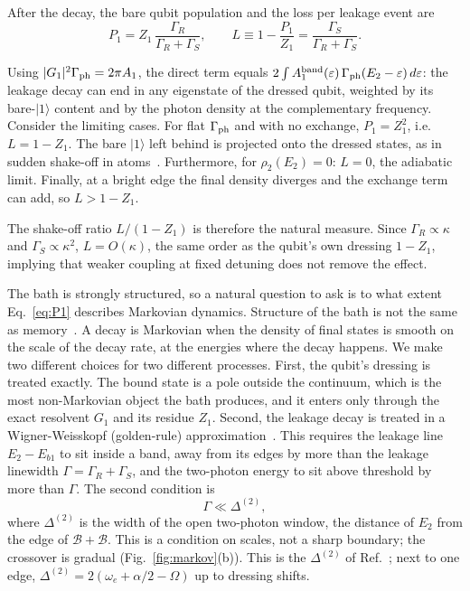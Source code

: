 \documentclass[aps,prresearch,twocolumn,superscriptaddress,nofootinbib,longbibliography,floatfix]{revtex4-2}
\begin{document}
After the decay, the bare qubit population and the loss per leakage event are
\begin{equation}
P_1=Z_1\,\frac{\Gamma_R}{\Gamma_R+\Gamma_{S}},\qquad L\equiv1-\frac{P_1}{Z_1}=\frac{\Gamma_{S}}{\Gamma_R+\Gamma_{S}} .
\label{eq:P1}
\end{equation}

Using $|G_1|^2\Gamma_{\rm ph}=2\pi A_1$, the direct term equals
$2\int A_1^{\rm band}(\varepsilon)\,\Gamma_{\rm ph}(E_2-\varepsilon)\,d\varepsilon$: the leakage decay can end in any
eigenstate of the dressed qubit, weighted by its bare-$|1\rangle$ content and by the photon density at the complementary
frequency. Consider the limiting cases. 
For flat $\Gamma_{\rm ph}$ and with no exchange, $P_1=Z_1^2$, i.e.\ $L=1-Z_1$. The bare $|1\rangle$ left behind is projected
onto the dressed states, as in sudden shake-off in atoms~\cite{Aberg1967,SchneiderChocianRost2002}. Furthermore, for $\rho_2(E_2)=0$: $L=0$, the adiabatic limit.
Finally, at a bright edge the final density diverges and the exchange term can add, so $L>1-Z_1$.

The shake-off ratio $L/(1-Z_1)$ is therefore the natural measure. Since $\Gamma_R\propto\kappa$ and
$\Gamma_S\propto\kappa^2$, $L=O(\kappa)$, the same order as the qubit's own dressing $1-Z_1$, implying that weaker coupling at fixed
detuning does not remove the effect.


The bath is strongly structured, so a natural question to ask is to what extent Eq.~\eqref{eq:P1} describes Markovian dynamics.
Structure of the bath is not the same as memory~\cite{Lambropoulos2000RPP,GonzalezTudelaCirac2017,Malekakhlagh2016}. A decay is
Markovian when the density of final states is smooth on the scale of the
decay rate, at the energies where the decay happens. We make two different choices for two different processes.
First, the qubit's dressing is treated exactly. The bound state is a pole outside the continuum, which is the most non-Markovian
object the bath produces, and it enters only through the exact resolvent $G_1$ and its residue $Z_1$.
Second, the leakage decay is treated in a Wigner-Weisskopf (golden-rule) approximation~\cite{CohenTannoudji1992}. This requires the leakage line
$E_2-E_{b1}$ to sit inside a band, away from its edges by more than the leakage linewidth $\Gamma=\Gamma_R+\Gamma_S$,
and the two-photon energy to sit above threshold by more than $\Gamma$. The second condition is
\begin{equation}
\Gamma\ll\Delta^{(2)},
\label{eq:markov}
\end{equation}
where $\Delta^{(2)}$ is the width of the open two-photon window, the distance of $E_2$ from the edge of
$\mathcal B+\mathcal B$. This is a condition on scales, not a sharp boundary; the crossover is gradual
(Fig.~\ref{fig:markov}(b)). This is the $\Delta^{(2)}$ of Ref.~\cite{NikolopoulosLambropoulos2000}; next to one edge,
$\Delta^{(2)}=2(\omega_e+\alpha/2-\Omega)$ up to dressing shifts.
\end{document}
